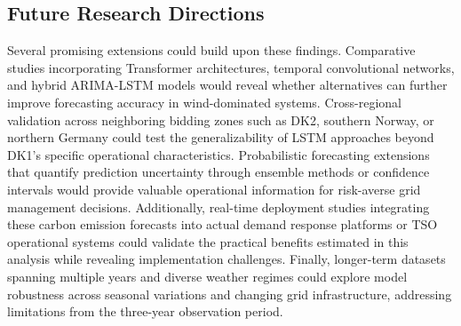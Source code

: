 \subsection{Future Research Directions}

Several promising extensions could build upon these findings. Comparative studies incorporating Transformer architectures, temporal convolutional networks, and hybrid ARIMA-LSTM models would reveal whether alternatives can further improve forecasting accuracy in wind-dominated systems. Cross-regional validation across neighboring bidding zones such as DK2, southern Norway, or northern Germany could test the generalizability of LSTM approaches beyond DK1's specific operational characteristics. Probabilistic forecasting extensions that quantify prediction uncertainty through ensemble methods or confidence intervals would provide valuable operational information for risk-averse grid management decisions. Additionally, real-time deployment studies integrating these carbon emission forecasts into actual demand response platforms or TSO operational systems could validate the practical benefits estimated in this analysis while revealing implementation challenges. Finally, longer-term datasets spanning multiple years and diverse weather regimes could explore model robustness across seasonal variations and changing grid infrastructure, addressing limitations from the three-year observation period.
